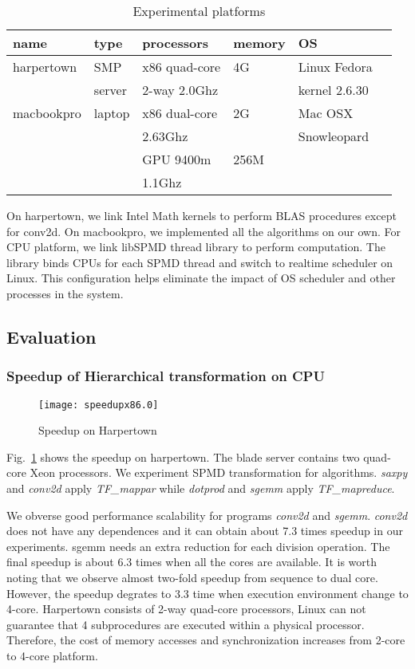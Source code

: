 \begin{table}[hbt]
\caption{Experimental platforms}\label{tbl:mach}
\begin{center}
\begin{tabular}{|l|l|l|l|l|r|}
\hline
\textbf{name}&\textbf{type}&\textbf{processors}&\textbf{memory}&\textbf{OS}\\
\hline
harpertown&SMP &x86 quad-core  &4G&Linux Fedora\\
                  &  server &   
2-way  2.0Ghz & &kernel 2.6.30\\
\hline
macbookpro&laptop &x86 dual-core &2G&Mac OSX\\
                    &           & 2.63Ghz         &  &Snowleopard\\
                   &           &GPU 9400m    &256M & \\
                    &           & 1.1Ghz   & &\\
\hline
\end{tabular} 
\end{center}
\end{table}
On harpertown, we link Intel Math kernels to perform BLAS procedures
except for conv2d. On macbookpro, we implemented all the algorithms on
our own. For CPU platform, we link libSPMD thread library to
perform computation. The library binds CPUs for each SPMD
thread and switch to realtime scheduler on Linux.  This configuration
helps eliminate the impact of OS scheduler and other processes in the system.
\subsection{Evaluation}
\subsubsection{Speedup of Hierarchical transformation on CPU}
\begin{figure}
\texttt{[image: speedupx86.0]}
\caption{Speedup on Harpertown}\label{fig:spdx86}
\end{figure}

Fig.~\ref{fig:spdx86} shows the speedup on harpertown. The blade
server contains two quad-core Xeon
processors. We experiment SPMD transformation for algorithms. \textit{saxpy} and
\textit{conv2d} apply  \emph{TF\_mappar} while \textit{dotprod} and \textit{sgemm} apply \emph{TF\_mapreduce}.

We obverse good performance scalability for programs
\textit{conv2d} and \textit{sgemm}. \textit{conv2d} does not have any dependences
and it can obtain about 7.3 times speedup in our experiments. sgemm
needs an extra reduction for each division operation. The final
speedup is about 6.3 times when all the cores are available. It is worth noting that we
observe almost two-fold speedup from sequence to dual core. However,
the speedup degrates to 3.3 time when execution
environment change to 4-core. Harpertown consists of  2-way quad-core processors,  Linux
can not guarantee that 4 subprocedures are executed within a physical
processor. Therefore, the cost of memory accesses and synchronization
increases from 2-core to 4-core platform. 

